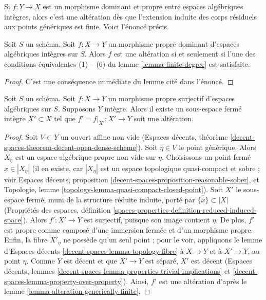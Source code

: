 \noindent
Si $f : Y \to X$ est un morphisme dominant et propre entre espaces
algébriques intègres, alors c'est une altération dès que l'extension induite
des corps résiduels aux points génériques est finie. Voici l'énoncé
précis.

\begin{lemma}
\label{lemma-alteration-generically-finite}
Soit $S$ un schéma. Soit $f : X \to Y$ un morphisme propre dominant
d'espaces algébriques intègres sur $S$. Alors $f$ est une altération
si et seulement si l'une des conditions équivalentes (1) -- (6) du
lemme \ref{lemma-finite-degree} est satisfaite.
\end{lemma}

\begin{proof}
C'est une conséquence immédiate du lemme cité dans l'énoncé.
\end{proof}

\begin{lemma}
\label{lemma-alteration-contained-in}
Soit $S$ un schéma. Soit $f : X \to Y$ un morphisme propre surjectif
d'espaces algébriques sur $S$. Supposons $Y$ intègre. Alors
il existe un sous-espace fermé intègre $X' \subset X$ tel que
$f' = f|_{X'} : X' \to Y$ soit une altération.
\end{lemma}

\begin{proof}
Soit $V \subset Y$ un ouvert affine non vide
(Espaces décents, théorème \ref{decent-spaces-theorem-decent-open-dense-scheme}).
Soit $\eta \in V$ le point générique. Alors
$X_\eta$ est un espace algébrique propre non vide sur $\eta$.
Choisissons un point fermé $x \in |X_\eta|$
(il en existe, car $|X_\eta|$ est un espace topologique quasi-compact
et sobre ; voir Espaces décents, proposition
\ref{decent-spaces-proposition-reasonable-sober},
et Topologie, lemme \ref{topology-lemma-quasi-compact-closed-point}).
Soit $X'$ le sous-espace fermé, muni de la structure réduite induite, porté par
$\overline{\{x\}} \subset |X|$ (Propriétés des espaces, définition
\ref{spaces-properties-definition-reduced-induced-space}).
Alors $f' : X' \to Y$ est surjectif, puisque son image contient $\eta$.
De plus, $f'$ est propre comme composé d'une immersion fermée
et d'un morphisme propre. Enfin, la fibre $X'_\eta$ ne possède qu'un
seul point ; pour le voir, appliquons le
lemme d'Espaces décents \ref{decent-spaces-lemma-topology-fibre}
à $X \to Y$ et à $X' \to Y$, au point $\eta$.
Comme $Y$ est décent et que $X' \to Y$ est séparé, $X'$ est décent
(Espaces décents, lemmes
\ref{decent-spaces-lemma-properties-trivial-implications} et
\ref{decent-spaces-lemma-property-over-property}).
Ainsi, $f'$ est une altération d'après le
lemme \ref{lemma-alteration-generically-finite}.
\end{proof}








